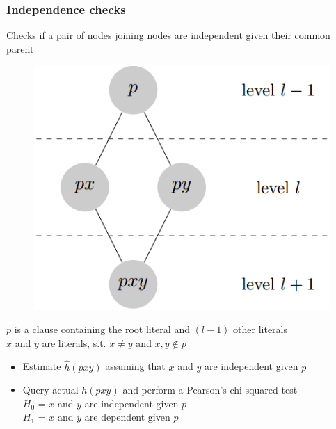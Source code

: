 \documentclass{beamer}
\begin{document}
\begin{frame}
\frametitle{Independence checks}
  Checks if a pair of nodes joining nodes are independent given their common parent
  \begin{figure}
  \includegraphics[height=0.4\textheight]{./Figures/indep}
  \end{figure}
  $p$ is a clause containing the root literal and $(l-1)$ other literals \\
  $x$ and $y$ are literals, s.t. $x \neq y$ and $x,y \not \in p$
  \begin{itemize}
    \item Estimate $\hat{h}(pxy)$ assuming that $x$ and $y$ are independent given $p$
    \item Query actual $h(pxy)$ and perform a Pearson's chi-squared test \\ \quad
	  $H_0$ = $x$ and $y$ are independent given $p$ \\ \quad
	  $H_1$ = $x$ and $y$ are dependent given $p$
  \end{itemize}
\end{frame}
\end{document}
